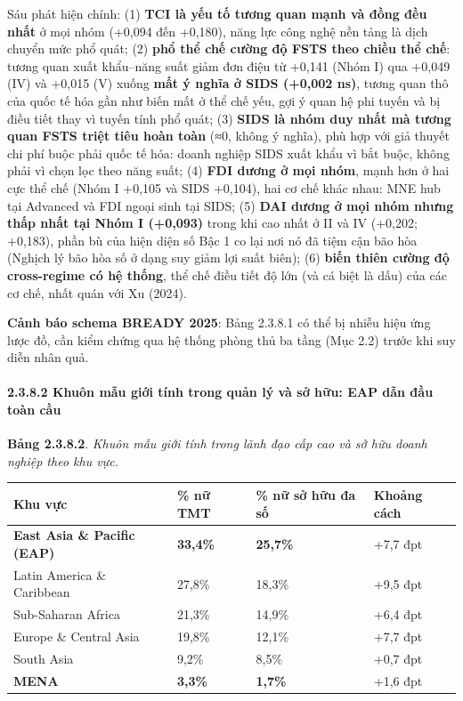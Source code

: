 \documentclass[
  a4paper,
  13pt]{extreport}
\begin{document}
Sáu phát hiện chính: (1) \textbf{TCI là yếu tố tương quan mạnh và đồng
đều nhất} ở mọi nhóm (+0,094 đến +0,180), năng lực công nghệ nền tảng là
dịch chuyển mức phổ quát; (2) \textbf{phổ thể chế cường độ FSTS theo
chiều thể chế}: tương quan xuất khẩu--năng suất giảm đơn điệu từ +0,141
(Nhóm I) qua +0,049 (IV) và +0,015 (V) xuống \textbf{mất ý nghĩa ở SIDS
(+0,002 ns)}, tương quan thô của quốc tế hóa gần như biến mất ở thể chế
yếu, gợi ý quan hệ phi tuyến và bị điều tiết thay vì tuyến tính phổ
quát; (3) \textbf{SIDS là nhóm duy nhất mà tương quan FSTS triệt tiêu
hoàn toàn} (≈0, không ý nghĩa), phù hợp với giả thuyết chi phí buộc phải
quốc tế hóa: doanh nghiệp SIDS xuất khẩu vì bắt buộc, không phải vì chọn
lọc theo năng suất; (4) \textbf{FDI dương ở mọi nhóm}, mạnh hơn ở hai
cực thể chế (Nhóm I +0,105 và SIDS +0,104), hai cơ chế khác nhau: MNE
hub tại Advanced và FDI ngoại sinh tại SIDS; (5) \textbf{DAI dương ở mọi
nhóm nhưng thấp nhất tại Nhóm I (+0,093)} trong khi cao nhất ở II và IV
(+0,202; +0,183), phần bù của hiện diện số Bậc 1 co lại nơi nó đã tiệm
cận bão hòa (Nghịch lý bão hòa số ở dạng suy giảm lợi suất biên); (6)
\textbf{biến thiên cường độ cross-regime có hệ thống}, thể chế điều tiết
độ lớn (và cá biệt là dấu) của các cơ chế, nhất quán với Xu (2024).

\textbf{Cảnh báo schema BREADY 2025}: Bảng 2.3.8.1 có thể bị nhiễu hiệu
ứng lược đồ, cần kiểm chứng qua hệ thống phòng thủ ba tầng (Mục 2.2)
trước khi suy diễn nhân quả.

\hypertarget{khuuxf4n-mux1eabu-giux1edbi-tuxednh-trong-quux1ea3n-luxfd-vuxe0-sux1edf-hux1eefu-eap-dux1eabn-ux111ux1ea7u-touxe0n-cux1ea7u}{%
\paragraph{2.3.8.2 Khuôn mẫu giới tính trong quản lý và sở hữu: EAP dẫn
đầu toàn
cầu}\label{khuuxf4n-mux1eabu-giux1edbi-tuxednh-trong-quux1ea3n-luxfd-vuxe0-sux1edf-hux1eefu-eap-dux1eabn-ux111ux1ea7u-touxe0n-cux1ea7u}}

\textbf{Bảng 2.3.8.2}. \emph{Khuôn mẫu giới tính trong lãnh đạo cấp cao
và sở hữu doanh nghiệp theo khu vực.}

\begin{longtable}[]{@{}llll@{}}
\toprule\noalign{}
Khu vực & \% nữ TMT & \% nữ sở hữu đa số & Khoảng cách \\
\midrule\noalign{}
\endhead
\bottomrule\noalign{}
\endlastfoot
\textbf{East Asia \& Pacific (EAP)} & \textbf{33,4\%} & \textbf{25,7\%}
& +7,7 đpt \\
Latin America \& Caribbean & 27,8\% & 18,3\% & +9,5 đpt \\
Sub-Saharan Africa & 21,3\% & 14,9\% & +6,4 đpt \\
Europe \& Central Asia & 19,8\% & 12,1\% & +7,7 đpt \\
South Asia & 9,2\% & 8,5\% & +0,7 đpt \\
\textbf{MENA} & \textbf{3,3\%} & \textbf{1,7\%} & +1,6 đpt \\
\end{longtable}
\end{document}
